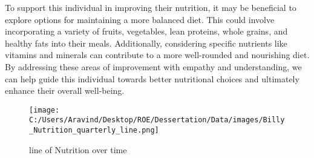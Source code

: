 \documentclass[10pt, a4paper]{article}%
\begin{document}
\newline%
To support this individual in improving their nutrition, it may be beneficial to explore options for maintaining a more balanced diet. This could involve incorporating a variety of fruits, vegetables, lean proteins, whole grains, and healthy fats into their meals. Additionally, considering specific nutrients like vitamins and minerals can contribute to a more well{-}rounded and nourishing diet.\newline%
\newline%
By addressing these areas of improvement with empathy and understanding, we can help guide this individual towards better nutritional choices and ultimately enhance their overall well{-}being.%
\begin{figure}[H]%
\centering%
\texttt{[image: C:/Users/Aravind/Desktop/ROE/Dessertation/Data/images/Billy\_Nutrition\_quarterly\_line.png]}%
\caption{line of Nutrition over time}%
\end{figure}

%
\end{document}

